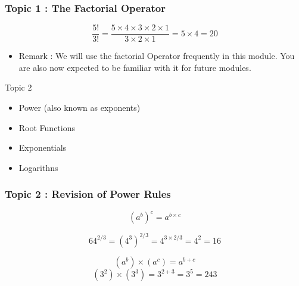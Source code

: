 \documentclass{beamer}
\begin{document}
\begin{frame}
	\frametitle{Topic 1 : The Factorial Operator}	
	\[ \frac{5!}{3!} = \frac{5 \times 4 \times 3 \times 2 \times 1}{ 3 \times 2 \times 1 }  = 5 \times 4 = 20 \]
	
	\begin{itemize}
		\item Remark :  We will use the factorial Operator frequently in this module. You are also now expected to be familiar with it for future modules.
	\end{itemize}
\end{frame}
\begin{frame}
	Topic 2
	\begin{itemize}
	\item Power (also known as exponents)
	\item Root Functions
	\item Exponentials
	\item Logarithns
\end{itemize}
\end{frame}
\begin{frame}
	\frametitle{Topic 2 : Revision of Power Rules}
	
	\[ (a^b)^c = a^{b \times c}\]
	
	\[ 64^{2/3} =  (4^3)^{2/3} = 4^{3\times2/3} = 4^2 = 16 \]
	
	
	\[ (a^b) \times (a^c) = a^{b+c}\]
	\[ (3^2) \times (3^3) = 3^{2+3} = 3^5  =243 \]
\end{frame}
\end{document}
